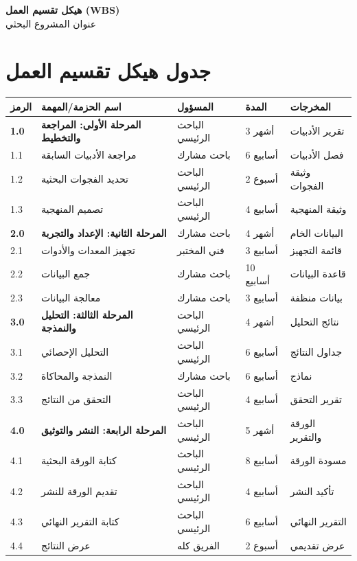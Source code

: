 \documentclass[11pt,a4paper]{article}
\begin{document}
\begin{center}
{\LARGE\bfseries هيكل تقسيم العمل (WBS)}\\[0.5em]
{\Large عنوان المشروع البحثي}\\[1em]
\end{center}

\section{جدول هيكل تقسيم العمل}
\label{sec:wbs_table}

\begin{table}[H]
\centering
\small
\renewcommand{\arraystretch}{1.3}
\begin{tabularx}{\textwidth}{C{1.5cm} L{5cm} L{3cm} C{2cm} X}
\toprule
\textbf{الرمز} & \textbf{اسم الحزمة/المهمة} & \textbf{المسؤول} & \textbf{المدة} & \textbf{المخرجات} \\
\midrule
{}
\textbf{1.0} & \textbf{المرحلة الأولى: المراجعة والتخطيط} & الباحث الرئيسي & 3 أشهر & تقرير الأدبيات \\
1.1 & مراجعة الأدبيات السابقة & باحث مشارك & 6 أسابيع & فصل الأدبيات \\
1.2 & تحديد الفجوات البحثية & الباحث الرئيسي & 2 أسبوع & وثيقة الفجوات \\
1.3 & تصميم المنهجية & الباحث الرئيسي & 4 أسابيع & وثيقة المنهجية \\
\midrule
{}
\textbf{2.0} & \textbf{المرحلة الثانية: الإعداد والتجربة} & باحث مشارك & 4 أشهر & البيانات الخام \\
2.1 & تجهيز المعدات والأدوات & فني المختبر & 3 أسابيع & قائمة التجهيز \\
2.2 & جمع البيانات & باحث مشارك & 10 أسابيع & قاعدة البيانات \\
2.3 & معالجة البيانات & باحث مشارك & 3 أسابيع & بيانات منظفة \\
\midrule
{}
\textbf{3.0} & \textbf{المرحلة الثالثة: التحليل والنمذجة} & الباحث الرئيسي & 4 أشهر & نتائج التحليل \\
3.1 & التحليل الإحصائي & الباحث الرئيسي & 6 أسابيع & جداول النتائج \\
3.2 & النمذجة والمحاكاة & باحث مشارك & 6 أسابيع & نماذج \\
3.3 & التحقق من النتائج & الباحث الرئيسي & 4 أسابيع & تقرير التحقق \\
\midrule
{}
\textbf{4.0} & \textbf{المرحلة الرابعة: النشر والتوثيق} & الباحث الرئيسي & 5 أشهر & الورقة والتقرير \\
4.1 & كتابة الورقة البحثية & الباحث الرئيسي & 8 أسابيع & مسودة الورقة \\
4.2 & تقديم الورقة للنشر & الباحث الرئيسي & 4 أسابيع & تأكيد النشر \\
4.3 & كتابة التقرير النهائي & الباحث الرئيسي & 6 أسابيع & التقرير النهائي \\
4.4 & عرض النتائج & الفريق كله & 2 أسبوع & عرض تقديمي \\
\bottomrule
\end{tabularx}
\end{table}
\end{document}
